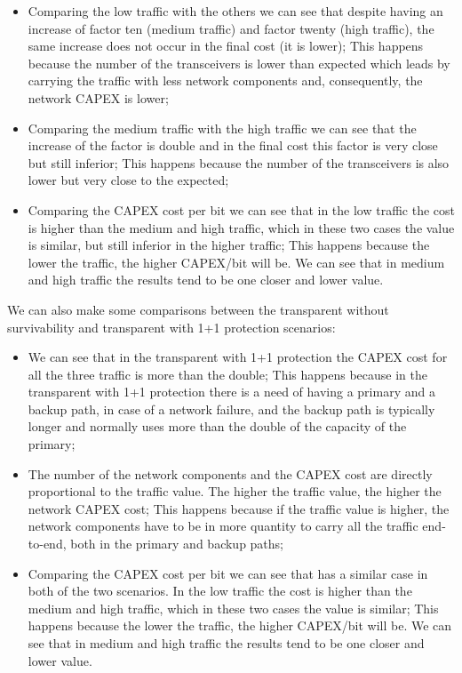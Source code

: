 \begin{itemize}
  \item Comparing the low traffic with the others we can see that despite having an increase of factor ten (medium traffic) and factor twenty (high traffic), the same increase does not occur in the final cost (it is lower);
  \subitem This happens because the number of the transceivers is lower than expected which leads by carrying the traffic with less network components and, consequently, the network CAPEX is lower;
  \item Comparing the medium traffic with the high traffic we can see that the increase of the factor is double and in the final cost this factor is very close but still inferior;
  \subitem This happens because the number of the transceivers is also lower but very close to the expected;
  \item Comparing the CAPEX cost per bit we can see that in the low traffic the cost is higher than the medium and high traffic, which in these two cases the value is similar, but still inferior in the higher traffic;
  \subitem This happens because the lower the traffic, the higher CAPEX/bit will be. We can see that in medium and high traffic the results tend to be one closer and lower value.
\end{itemize}

\noindent
We can also make some comparisons between the transparent without survivability and transparent with 1+1 protection scenarios:

\begin{itemize}
  \item We can see that in the transparent with 1+1 protection the CAPEX cost for all the three traffic is more than the double;
    \subitem This happens because in the transparent with 1+1 protection there is a need of having a primary and a backup path, in case of a network failure, and the backup path is typically longer and normally uses more than the double of the capacity of the primary;
  \item The number of the network components and the CAPEX cost are directly proportional to the traffic value. The higher the traffic value, the higher the network CAPEX cost;
  \subitem This happens because if the traffic value is higher, the network components have to be in more quantity to carry all the traffic end-to-end, both in the primary and backup paths;
  \item Comparing the CAPEX cost per bit we can see that has a similar case in both of the two scenarios. In the low traffic the cost is higher than the medium and high traffic, which in these two cases the value is similar;
  \subitem This happens because the lower the traffic, the higher CAPEX/bit will be. We can see that in medium and high traffic the results tend to be one closer and lower value.
\end{itemize}

